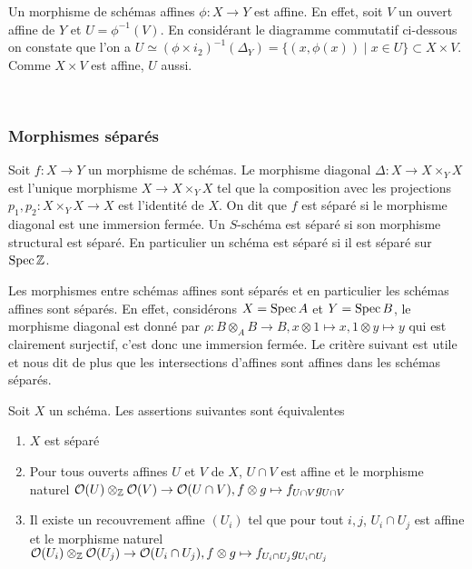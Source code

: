 \begin{ex}\label{exaff}
Un morphisme de schémas affines $\phi: X\rightarrow Y$ est affine. En effet, soit $V$ un ouvert affine de $Y$ et $U=\phi^{-1}(V)$. En considérant le diagramme commutatif ci-dessous on constate que l'on a $U \simeq (\phi\times i_2)^{-1}(\Delta_Y)=\lbrace (x,\phi(x))\mid x\in U \rbrace \subset X\times V$. Comme $X\times V$ est affine, $U$ aussi.
	\begin{center}
	\\
	\end{center}

\end{ex}

\subsubsection{Morphismes séparés}

\begin{defn}
Soit $f:X\rightarrow Y$ un morphisme de schémas. Le morphisme diagonal $\Delta:X\rightarrow X\times_Y X$ est l'unique morphisme $X\rightarrow X\times_Y X$ tel que la composition avec les projections $p_1,p_2:X\times_Y X\rightarrow X$ est l'identité de $X$. On dit que $f$ est séparé si le morphisme diagonal est une immersion fermée.
Un $S$-schéma est séparé si son morphisme structural est séparé. En particulier un schéma est séparé si il est séparé sur $\operatorname{Spec}\mathbb{Z}$.
\end{defn}

Les morphismes entre schémas affines sont séparés et en particulier les schémas affines sont séparés. En effet, considérons $X=\operatorname{Spec} A$ et $Y=\operatorname{Spec} B$, le morphisme diagonal est donné par $\rho: B\otimes_A B\rightarrow B, x\otimes 1\mapsto x, 1\otimes y \mapsto y$ qui est clairement surjectif, c'est donc une immersion fermée. Le critère suivant est utile et nous dit de plus que les intersections d'affines sont affines dans les schémas séparés.

\begin{prop}\label{sepCritere}
Soit $X$ un schéma. Les assertions suivantes sont équivalentes
	\begin{enumerate}
	\item $X$ est séparé
	\item Pour tous ouverts affines $U$ et $V$ de $X$, $U\cap V$ est affine et le morphisme naturel $\mathcal{O}(U)\otimes_{\mathbb{Z}} \mathcal{O}(V)\rightarrow\mathcal{O}(U\cap V), f\otimes g\mapsto f_{U\cap V}g_{U\cap V}$
	\item Il existe un recouvrement affine $(U_i)$ tel que pour tout $i,j$, $U_i\cap U_j$ est affine et le morphisme naturel $\mathcal{O}(U_i)\otimes_{\mathbb{Z}} \mathcal{O}(U_j)\rightarrow\mathcal{O}(U_i\cap U_j), f\otimes g\mapsto f_{U_i\cap U_j}g_{U_i\cap U_j}$
	\end{enumerate}
\end{prop}

